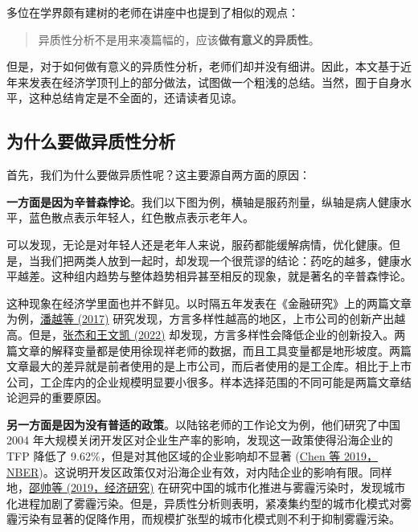 \documentclass[11pt,a4paper]{ctexart}
\begin{document}
多位在学界颇有建树的老师在讲座中也提到了相似的观点：

\begin{quote}
异质性分析不是用来凑篇幅的，应该\textbf{做有意义的异质性}。
\end{quote}

但是，对于如何做有意义的异质性分析，老师们却并没有细讲。因此，本文基于近年来发表在经济学顶刊上的部分做法，试图做一个粗浅的总结。当然，囿于自身水平，这种总结肯定是不全面的，还请读者见谅。

\subsection{为什么要做异质性分析}

首先，我们为什么要做异质性呢？这主要源自两方面的原因：

\textbf{一方面是因为辛普森悖论}。我们以下图为例，横轴是服药剂量，纵轴是病人健康水平，蓝色散点表示年轻人，红色散点表示老年人。

可以发现，无论是对年轻人还是老年人来说，服药都能缓解病情，优化健康。但是，当我们把两类人放到一起时，却发现一个很荒谬的结论：药吃的越多，健康水平越差。这种组内趋势与整体趋势相异甚至相反的现象，就是著名的辛普森悖论。

这种现象在经济学里面也并不鲜见。以时隔五年发表在《金融研究》上的两篇文章为例，\href{https://kns.cnki.net/kcms2/article/abstract?v=LZqzfHN4DsVEB0smlnC5OMqzJgRw_gg_XeuSICO1BCmw5dv2nqyrzIg0ArtNx86BOb2hXwR992cCmlKQC479kaKE4301fmbbdr3S3DApT0pUtDSwK3f5DCjwG7PtEBZT&uniplatform=NZKPT&language=gb}{潘越等
(2017)}
研究发现，方言多样性越高的地区，上市公司的创新产出越高。但是，\href{https://kns.cnki.net/kcms2/article/abstract?v=LZqzfHN4DsVLDDX2-FYwe1eBB_fFFpHoTb_MEMl8BYlkdUZId1T8lVgigltAy5S_UXLDSUumnCcnW_yLbvvXhdLP0OSR7qAqW-HSmffWSi23-cW1aswhu2kVq12IROGJ&uniplatform=NZKPT&language=gb}{张杰和王文凯
(2022)}
却发现，方言多样性会降低企业的创新投入。两篇文章的解释变量都是使用徐现祥老师的数据，而且工具变量都是地形坡度。两篇文章最大的差异就是前者使用的是上市公司，而后者使用的是工企库。相比于上市公司，工企库内的企业规模明显要小很多。样本选择范围的不同可能是两篇文章结论迥异的重要原因。

\textbf{另一方面是因为没有普适的政策}。以陆铭老师的工作论文为例，他们研究了中国
2004 年大规模关闭开发区对企业生产率的影响，发现这一政策使得沿海企业的
TFP 降低了 9.62\%，但是对其他区域的企业影响却不显著
(\href{https://www.nber.org/papers/w26148}{Chen 等
2019，NBER})。这说明开发区政策仅对沿海企业有效，对内陆企业的影响有限。同样地，\href{https://t.cnki.net/kcms/detail?v=3uoqIhG8C44YLTlOAiTRKibYlV5Vjs7iLik5jEcCI09uHa3oBxtWoHGwy9XepWzLNRAFs97hGIGeJJ-qkNthXTWHqSJlD67h&uniplatform=NZKPT}{邵帅等
(2019，经济研究)}
在研究中国的城市化推进与雾霾污染时，发现城市化进程加剧了雾霾污染。但是，异质性分析则表明，紧凑集约型的城市化模式对雾霾污染有显著的促降作用，而规模扩张型的城市化模式则不利于抑制雾霾污染。
\end{document}
